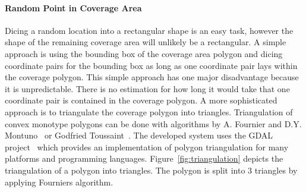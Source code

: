 \documentclass[master,english]{hgbthesis}
\begin{document}
\paragraph{Random Point in Coverage Area}
Dicing a random location into a rectangular shape is an easy task, however the shape of the remaining coverage area will unlikely be a rectangular. A simple approach is using the bounding box of the coverage area polygon and dicing coordinate pairs for the bounding box as long as one coordinate pair lays within the coverage polygon. This simple approach has one major disadvantage because it is unpredictable. There is no estimation for how long it would take that one coordinate pair is contained in the coverage polygon.
A more sophisticated approach is to triangulate the coverage polygon into triangles. Triangulation of convex monotype polygons can be done with algorithms by A. Fournier and D.Y. Montuno~\cite{Fournier1984} or Godfried Toussaint~\cite{Toussaint1984}. The developed system uses the GDAL project~\cite{GDAL} which provides an implementation of polygon triangulation for many platforms and programming languages.
Figure~\ref{fig:triangulation} depicts the triangulation of a polygon into triangles. The polygon is split into 3 triangles by applying Fourniers algorithm.
\end{document}
